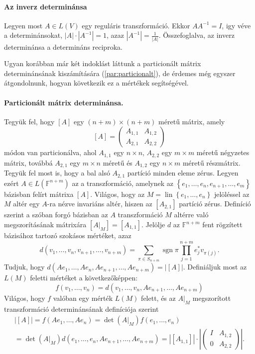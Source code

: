\documentclass[a4paper, showtrims]{memoir}
\theoremstyle{plain}
\theoremstyle{remark}
\theoremstyle{definition}
\DeclareMathOperator{\sgn}{sgn}
\DeclareMathOperator{\lin}{lin}
\begin{document}
\paragraph{Az inverz determinánsa}
Legyen most $A\in L\left( V \right)$ egy reguláris transzformáció.
Ekkor $AA^{-1}=I$, igy véve a determinánsokat, $|A|\cdot|A^{-1}|=1$, azaz
$|A^{-1}|=\frac{1}{|A|}$.
Összefoglalva, az inverz determinánsa a determináns reciproka.

Ugyan korábban már két indoklást láttunk a particionált mátrix determinánsának kiszámítására (\ref{par:particionalt}), 
de érdemes még egyszer átgondolnunk, hogyan következik ez a mértékek segítségével.
\paragraph{Particionált mátrix determinánsa.}\label{par:particionalt2}
Tegyük fel, hogy $[A]$ egy $(n+m)\times(n+m)$ méretű mátrix,
amely
\[
    [A]
	=
	\begin{pmatrix}
		A_{1,1} & A_{1,2} \\
		A_{2,1} & A_{2,2}
	\end{pmatrix}
\]
módon van particionálva, ahol $A_{1,1}$ egy $n\times n$, $A_{2,2}$ egy $m\times m$ méretű négyzetes mátrix,
továbbá $A_{2,1}$ egy $m\times n$ méretű és $A_{1,2}$ egy $n\times m$ méretű részmátrix.
Tegyük fel most is, hogy a bal alsó $A_{2,1}$ partíció minden eleme zérus.
Legyen ezért $A\in L\left( \mathbb{F}^{n+m} \right)$ az a transzformáció,
amelynek az $\left\{ e_1,\ldots,e_n,e_{n+1},\ldots,e_m \right\}$ bázisban felírt mátrixa $[A]$.
Világos, hogy az $M=\lin\left\{ e_1,\ldots,e_n \right\}$ jelöléssel az $M$ altér egy $A$-ra nézve invariáns altér, hiszen az $[A_{2,1}]$ partíció zérus.
Definíció szerint a szóban forgó bázisban az $A$ transzformáció $M$ altérre való megszorításának mátrixára $[A|_M]=[A_{1,1}]$.
Jelölje $d$ az $\mathbb{F}^{n+m}$ fent rögzített bázisához tartozó szokásos mértéket, azaz
\[
    d\left( v_1,\ldots,v_n,v_{n+1},\ldots,v_{n+m} \right)
    =
    \sum_{\pi\in S_{n+m}}\sgn \pi\prod_{j=1}^{n+m}e_j^\ast v_{\pi\left( j \right)}.
\]
Tudjuk, hogy $d\left( Ae_1,\ldots,Ae_{n},Ae_{n+1},\ldots,Ae_{n+m} \right)=|[A]|$.
Definiáljuk most az $L\left( M \right)$ feletti mértéket a következőképpen:
\[
    f\left( v_1,\ldots,v_{n} \right)
    =
    d\left( v_1,\ldots,v_n, Ae_{n+1},\ldots,Ae_{n+m} \right)
\]
Világos, hogy $f$ valóban egy mérték $L\left( M \right)$ felett,
és az $A|_M$ megszorított transzformáció determinánsának definíciója szerint
\begin{multline*}
    |[A]|=
    f\left( Ae_1,\ldots,Ae_n \right)
    =
    \det\left( A|_M \right)f\left( e_1,\ldots,e_n \right)
    \\
    =
    \det\left( A|_M \right)d\left( e_1,\ldots,e_n,Ae_{n+1},\ldots,Ae_{n+m} \right)
    =
    |[A_{1,1}]|\cdot
    \left|
    \begin{pmatrix}
        I&A_{1,2}\\0&A_{2,2}
    \end{pmatrix}
    \right|.
\end{multline*}
\end{document}
